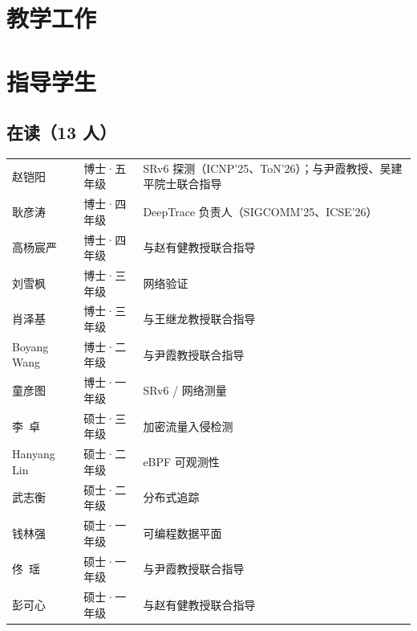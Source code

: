 \documentclass[11pt]{article}
\begin{document}
\section{教学工作}
\begin{kvlist}
\end{kvlist}

\section{指导学生}
\subsection*{在读（13 人）}
\noindent\small
\begin{tabularx}{\linewidth}{@{}>{\raggedright\arraybackslash}p{3.6cm}>{\raggedright\arraybackslash}p{2.7cm}X@{}}
赵铠阳 & 博士·五年级 & SRv6 探测（ICNP'25、ToN'26）；与尹霞教授、吴建平院士联合指导 \\
耿彦涛 & 博士·四年级 & DeepTrace 负责人（SIGCOMM'25、ICSE'26） \\
高杨宸严 & 博士·四年级 & 与赵有健教授联合指导 \\
刘雪枫 & 博士·三年级 & 网络验证 \\
肖泽基 & 博士·三年级 & 与王继龙教授联合指导 \\
Boyang Wang & 博士·二年级 & 与尹霞教授联合指导 \\
童彦图 & 博士·一年级 & SRv6 / 网络测量 \\
李\ 卓 & 硕士·三年级 & 加密流量入侵检测 \\
Hanyang Lin & 硕士·二年级 & eBPF 可观测性 \\
武志衡 & 硕士·二年级 & 分布式追踪 \\
钱林强 & 硕士·一年级 & 可编程数据平面 \\
佟\ 瑶 & 硕士·一年级 & 与尹霞教授联合指导 \\
彭可心 & 硕士·一年级 & 与赵有健教授联合指导 \\
\end{tabularx}
\end{document}
